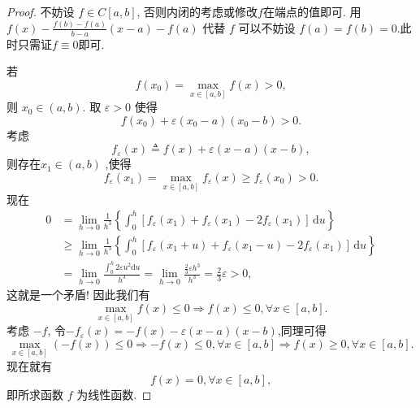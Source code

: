 \documentclass[../../main.tex]{subfiles}
\begin{document}
\begin{proof}
不妨设 $f \in C[a,b]$, 否则内闭的考虑或修改$f$在端点的值即可. 用 $f(x) - \frac{f(b) - f(a)}{b - a}(x - a) - f(a)$ 代替 $f$ 可以不妨设 $f(a) = f(b) = 0$.此时只需证$f\equiv 0$即可.

若
\[
f(x_0) = \max_{x \in [a,b]} f(x) > 0,
\]
则 $x_0 \in (a,b)$. 取 $\varepsilon > 0$ 使得
\[
f(x_0) + \varepsilon (x_0 - a)(x_0 - b) > 0.
\]
考虑
\[
f_\varepsilon(x) \triangleq f(x) + \varepsilon (x - a)(x - b),
\]
则存在$x_1 \in (a,b)$ ,使得
\[
f_\varepsilon(x_1) = \max_{x \in [a,b]} f_\varepsilon(x) \geqslant f_{\varepsilon}(x_0)> 0.
\]
现在
\begin{align*}
0&=\lim_{h\rightarrow 0} \frac{1}{h^3}\left\{ \int_0^h{[f_{\varepsilon}(x_1)+f_{\varepsilon}(x_1)-2f_{\varepsilon}(x_1)]\,\mathrm{d}u} \right\} 
\\
&\geqslant \lim_{h\rightarrow 0} \frac{1}{h^3}\left\{ \int_0^h{[f_{\varepsilon}(x_1+u)+f_{\varepsilon}(x_1-u)-2f_{\varepsilon}(x_1)]\,\mathrm{d}u} \right\} 
\\
&=\lim_{h\rightarrow 0} \frac{\int_0^h{2\varepsilon u^2\mathrm{d}u}}{h^3}=\lim_{h\rightarrow 0} \frac{\frac{2}{3}\varepsilon h^3}{h^3}=\frac{2}{3}\varepsilon >0,
\end{align*}
这就是一个矛盾! 因此我们有
\[
\max_{x\in [a,b]} f(x)\leqslant 0\Longrightarrow f\left( x \right) \leqslant 0,\forall x\in \left[ a,b \right] .
\]
考虑 $-f$, 令$-f_{\varepsilon}\left( x \right) =-f\left( x \right) -\varepsilon \left( x-a \right) \left( x-b \right) $,同理可得
\[
\max_{x\in [a,b]} (-f(x))\leqslant 0\Longrightarrow -f\left( x \right) \leqslant 0,\forall x\in \left[ a,b \right] \Longrightarrow f\left( x \right) \geqslant 0,\forall x\in \left[ a,b \right] .
\]
现在就有
\[
f(x) = 0, \forall x \in [a,b],
\]
即所求函数 $f$ 为线性函数.
\end{proof}
\end{document}
